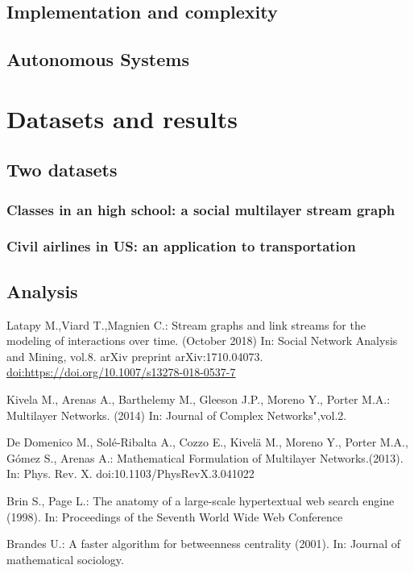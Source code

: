 \documentclass{svproc}
\begin{document}
\subsection{Implementation and complexity}
%
\subsection{Autonomous Systems}
%

\section{Datasets and results}
%
\subsection{Two datasets}
%
\subsubsection{Classes in an high school: a social multilayer stream graph}
%
\subsubsection{Civil airlines in US: an application to transportation}
%
\subsection{Analysis}
%

%
\begin{thebibliography}{6}
%


Latapy M.,Viard T.,Magnien C.: Stream graphs and link streams for the modeling
of interactions over time. (October 2018) In: Social Network Analysis and Mining, vol.8. arXiv preprint arXiv:1710.04073. \url{doi:https://doi.org/10.1007/s13278-018-0537-7}

Kivela M., Arenas A., Barthelemy M., Gleeson J.P., Moreno Y., Porter M.A.: Multilayer Networks. (2014) In: Journal of Complex Networks",vol.2.

De Domenico M., Sol\'e-Ribalta A., Cozzo E., Kivel\"a M., Moreno Y., Porter M.A., G\'omez S., Arenas A.: Mathematical Formulation of Multilayer Networks.(2013). In: Phys. Rev. X. doi:10.1103/PhysRevX.3.041022

Brin S., Page L.: The anatomy of a large-scale hypertextual web search engine (1998). In: Proceedings of the Seventh World Wide Web Conference

Brandes U.: A faster algorithm for betweenness centrality (2001). In: Journal of mathematical sociology.



\end{thebibliography}
\end{document}
